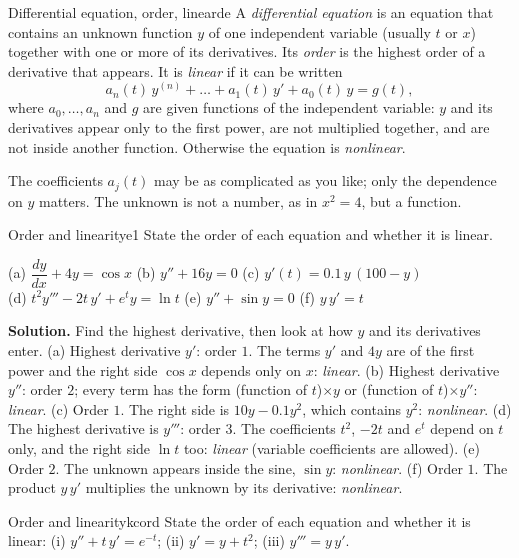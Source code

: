 \documentclass[11pt]{article}
\begin{document}
\begin{defn}{Differential equation, order, linear}{de}
A \emph{differential equation} is an equation that contains an unknown function $y$ of one independent variable (usually $t$ or $x$) together with one or more of its derivatives. Its \emph{order} is the highest order of a derivative that appears. It is \emph{linear} if it can be written
\[
a_n(t)\,y^{(n)}+\dots+a_1(t)\,y'+a_0(t)\,y=g(t),
\]
where $a_0,\dots,a_n$ and $g$ are given functions of the independent variable: $y$ and its derivatives appear only to the first power, are not multiplied together, and are not inside another function. Otherwise the equation is \emph{nonlinear}.
\end{defn}

The coefficients $a_j(t)$ may be as complicated as you like; only the dependence on $y$ matters. The unknown is not a number, as in $x^2=4$, but a function.

\begin{exmp}{Order and linearity}{e1}
State the order of each equation and whether it is linear.
\begin{center}
(a) $\dfrac{dy}{dx}+4y=\cos x$ \quad (b) $y''+16y=0$ \quad (c) $y'(t)=0.1\,y\,(100-y)$\\[4pt]
(d) $t^2y'''-2t\,y'+e^ty=\ln t$ \quad (e) $y''+\sin y=0$ \quad (f) $y\,y'=t$
\end{center}

\textbf{Solution.} Find the highest derivative, then look at how $y$ and its derivatives enter.
(a) Highest derivative $y'$: order $1$. The terms $y'$ and $4y$ are of the first power and the right side $\cos x$ depends only on $x$: \emph{linear}.
(b) Highest derivative $y''$: order $2$; every term has the form (function of $t$)$\times y$ or (function of $t$)$\times y''$: \emph{linear}.
(c) Order $1$. The right side is $10y-0.1y^2$, which contains $y^2$: \emph{nonlinear}.
(d) The highest derivative is $y'''$: order $3$. The coefficients $t^2$, $-2t$ and $e^t$ depend on $t$ only, and the right side $\ln t$ too: \emph{linear} (variable coefficients are allowed).
(e) Order $2$. The unknown appears inside the sine, $\sin y$: \emph{nonlinear}.
(f) Order $1$. The product $y\,y'$ multiplies the unknown by its derivative: \emph{nonlinear}.
\end{exmp}

\begin{kc}{Order and linearity}{kcord}
State the order of each equation and whether it is linear: (i) $y''+t\,y'=e^{-t}$; (ii) $y'=y+t^2$; (iii) $y'''=y\,y'$.
\end{kc}
\end{document}
